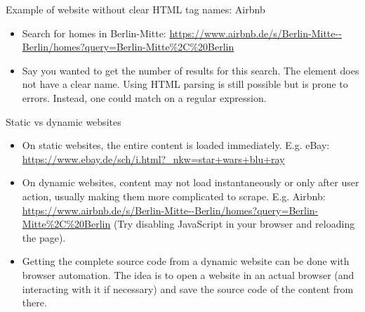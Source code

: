 \begin{frame}{Example of website without clear HTML tag names: Airbnb}
\begin{itemize}
	\item Search for homes in Berlin-Mitte: \url{https://www.airbnb.de/s/Berlin-Mitte--Berlin/homes?query=Berlin-Mitte\%2C\%20Berlin}
	\item Say you wanted to get the number of results for this search. The element does not have a clear name. Using HTML parsing is still possible but is prone to errors. Instead, one could match on a regular expression.
\end{itemize}

\end{frame}

\begin{frame}{Static vs dynamic websites}
\begin{itemize}
	\item On static websites, the entire content is loaded immediately. E.g. eBay: \url{https://www.ebay.de/sch/i.html?_nkw=star+wars+blu+ray}
	\item On dynamic websites, content may not load instantaneously or only after user action, usually making them more complicated to scrape. E.g. Airbnb: \url{https://www.airbnb.de/s/Berlin-Mitte--Berlin/homes?query=Berlin-Mitte\%2C\%20Berlin} (Try disabling JavaScript in your browser and reloading the page).
	\item Getting the complete source code from a dynamic website can be done with browser automation. The idea is to open a website in an actual browser (and interacting with it if necessary) and save the source code of the content from there.
\end{itemize}
\end{frame}

